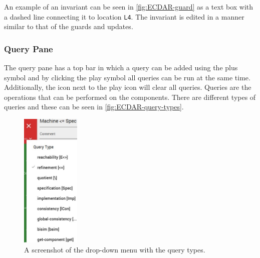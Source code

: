 An example of an invariant can be seen in \autoref{fig:ECDAR-guard} as a text box with a dashed line connecting it to location \texttt{L4}. The invariant is edited in a manner similar to that of the guards and updates. 


\subsubsection{Query Pane}
The query pane has a top bar in which a query can be added using the plus symbol and by clicking the play symbol all queries can be run at the same time. Additionally, the icon next to the play icon will clear all queries. Queries are the operations that can be performed on the components. There are different types of queries and these can be seen in \autoref{fig:ECDAR-query-types}. 

\begin{figure}[H]
    \centering
    \includegraphics[width=0.25\textwidth]{common/figures/check-type.jpg}
    \caption{A screenshot of the drop-down menu with the query types.}
    \label{fig:ECDAR-query-types}
\end{figure}


